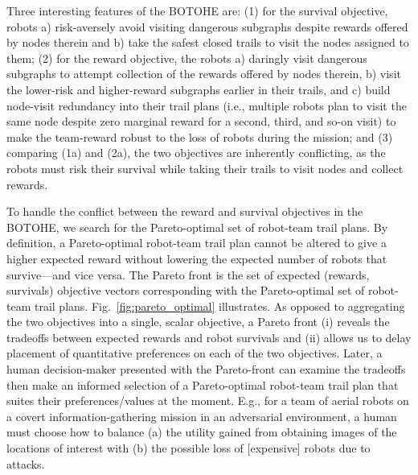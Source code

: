 \documentclass[fleqn,10pt,lineno]{wlpeerj}
\begin{document}
Three interesting features of the BOTOHE are: 
(1) for the survival objective, robots a) risk-aversely avoid visiting dangerous subgraphs despite rewards offered by nodes therein and b) take the safest closed trails to visit the nodes assigned to them;
(2) for the reward objective, the robots a) daringly visit dangerous subgraphs to attempt collection of the rewards offered by nodes therein, b) visit the lower-risk and higher-reward subgraphs earlier in their trails, and c) build node-visit redundancy into their trail plans (i.e., multiple robots plan to visit the same node despite zero marginal reward for a second, third, and so-on visit) to make the team-reward robust to the loss of robots during the mission; and
(3) comparing (1a) and (2a), the two objectives are inherently conflicting, as the robots must risk their survival while taking their trails to visit nodes and collect rewards.%

To handle the conflict between the reward and survival objectives in the BOTOHE, we search for the Pareto-optimal set \cite{pardalos2017non,branke2008multiobjective} of robot-team trail plans. By definition, a Pareto-optimal robot-team trail plan cannot be altered to give a higher expected reward without lowering the expected number of robots that survive---and vice versa. The Pareto front is the set of expected (rewards, survivals) objective vectors corresponding with the Pareto-optimal set of robot-team trail plans.
Fig.~\ref{fig:pareto_optimal} illustrates.
As opposed to aggregating the two objectives into a single, scalar objective, a Pareto front (i) reveals the tradeoffs between expected rewards and robot survivals and (ii) allows us to delay placement of quantitative preferences on each of the two objectives.
Later, a human decision-maker presented with the Pareto-front can examine the tradeoffs then make an informed selection of a Pareto-optimal robot-team trail plan that suites their preferences/values at the moment.
E.g., for a team of aerial robots on a covert information-gathering mission in an adversarial environment, a human must choose how to balance (a) the utility gained from obtaining images of the locations of interest with (b) the possible loss of [expensive] robots due to attacks.
\end{document}
